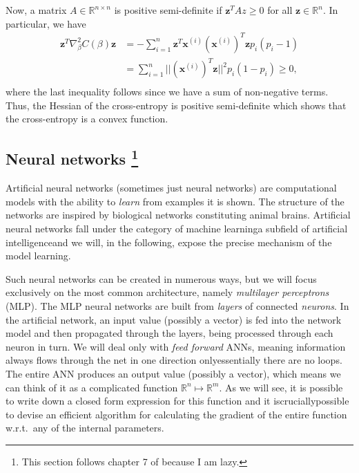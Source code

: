 \documentclass[a4paper, twocolumn]{article}
\begin{document}
Now, a matrix $A \in \mathbb{R}^{n \times n}$ is positive semi-definite if $\mathbf{z}^T A z \geq 0$ for all $\mathbf{z} \in \mathbb{R}^n$.
In particular, we have 
\begin{align*}
 \mathbf{z}^T \nabla^2_\beta C(\beta) \mathbf{z} &=  -\sum_{i=1}^n \mathbf{z}^T \mathbf{x}^{(i)} (\mathbf{x}^{(i)})^T \mathbf{z} p_i(p_i-1) \\
 &= \sum_{i=1}^n || (\mathbf{x}^{(i)})^T \mathbf{z} ||^2 p_i (1-p_i) \geq 0, \\
\end{align*}
where the last inequality follows since we have a sum of non-negative terms. Thus, the Hessian of the cross-entropy is 
positive semi-definite which shows that the cross-entropy is a convex function.


\subsection[Neural networks]{Neural networks \protect\footnote{This section follows chapter 7 of \cite{ledum2017computational} because I am lazy.}}
Artificial neural networks (sometimes just neural networks) are computational models with the ability to \textit{learn} from examples it is shown. The structure of the networks are inspired by biological networks constituting animal brains. Artificial neural networks fall under the category of machine learning\textemdash a subfield of artificial intelligence\textemdash and we will, in the following, expose the precise mechanism of the model learning. 

Such neural networks can be created in numerous ways, but we will focus exclusively on the most common architecture, namely \emph{multilayer perceptrons} (MLP). The MLP neural networks are built from \emph{layers} of connected \emph{neurons}. In the artificial network, an input value (possibly a vector) is fed into the network model and then propagated through the layers, being processed through each neuron in turn. We will deal only with \emph{feed forward} ANNs, meaning information always flows through the net in one direction only\textemdash essentially there are no loops. The entire ANN produces an output value (possibly a vector), which means we can think of it as a complicated function $\mathbb{R}^n\mapsto \mathbb{R}^m$. As we will see, it is possible to write down a closed form expression for this function and it is\textemdash crucially\textemdash possible to devise an efficient algorithm for calculating the gradient of the entire function w.r.t.\ any of the internal parameters.
\end{document}
